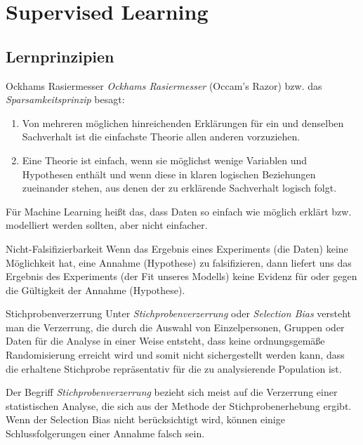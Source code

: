 \section{Supervised Learning}

\subsection{Lernprinzipien}

\begin{defi}{Ockhams Rasiermesser}
    \emph{Ockhams Rasiermesser} (Occam's Razor) bzw. das \emph{Sparsamkeitsprinzip} besagt:
    \begin{enumerate}
        \item Von mehreren möglichen hinreichenden Erklärungen für ein und denselben Sachverhalt ist die einfachste Theorie allen anderen vorzuziehen.
        \item Eine Theorie ist einfach, wenn sie möglichst wenige Variablen und Hypothesen enthält und wenn diese in klaren logischen Beziehungen zueinander stehen, aus denen der zu erklärende Sachverhalt logisch folgt.
    \end{enumerate}

    Für Machine Learning heißt das, dass Daten so einfach wie möglich erklärt bzw. modelliert werden sollten, aber nicht einfacher.
\end{defi}

\begin{bonus}{Nicht-Falsifizierbarkeit}
    Wenn das Ergebnis eines Experiments (die Daten) keine Möglichkeit hat, eine Annahme (Hypothese) zu falsifizieren, dann liefert uns das Ergebnis des Experiments (der Fit unseres Modells) keine Evidenz für oder gegen die Gültigkeit der Annahme (Hypothese).
\end{bonus}

\begin{defi}{Stichprobenverzerrung}
    Unter \emph{Stichprobenverzerrung} oder \emph{Selection Bias} versteht man die Verzerrung, die durch die Auswahl von Einzelpersonen, Gruppen oder Daten für die Analyse in einer Weise entsteht, dass keine ordnungsgemäße Randomisierung erreicht wird und somit nicht sichergestellt werden kann, dass die erhaltene Stichprobe repräsentativ für die zu analysierende Population ist.

    Der Begriff \emph{Stichprobenverzerrung} bezieht sich meist auf die Verzerrung einer statistischen Analyse, die sich aus der Methode der Stichprobenerhebung ergibt.
    Wenn der Selection Bias nicht berücksichtigt wird, können einige Schlussfolgerungen einer Annahme falsch sein.
\end{defi}

